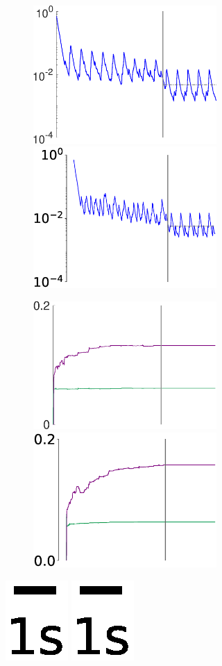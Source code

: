 \begin{figure}
\begin{subfigure}{\textwidth}
\begin{subfigure}{\textwidth}
        \end{subfigure}
        
        \textbf{}\begin{subfigure}{\textwidth}
        \centering
        
        \includegraphics[height=0.12\linewidth,width=.45\linewidth]{Figures/Fig_T1/MATLAB/ST_T1_MSE.eps}
        \includegraphics[height=0.12\linewidth,width=.45\linewidth]{Figures/Fig_T1/Python/ST_T1_MSE.eps}
        
        \end{subfigure}
        
        
        \textbf{}\begin{subfigure}{\textwidth}
        \centering
        
        \includegraphics[trim=0cm 0cm 1cm 0cm, clip=true,height=0.12\linewidth,width=.45\linewidth]{Figures/Fig_T1/MATLAB/ST_T1_W_norm.eps}
        \hspace{.3em}
        \includegraphics[trim=0cm 0cm 1cm 0cm, clip=true,height=0.12\linewidth,width=.45\linewidth]{Figures/Fig_T1/Python/ST_T1_W_norm.eps}
        
        \end{subfigure}


        
        
        \includegraphics[trim=2cm 6cm 2cm 6cm, clip=true,height=0.05\linewidth,width=.4\linewidth]{Figures/Fig_T1/Python/ST_T1_Scale.eps}
        \includegraphics[trim=2cm 4cm 2cm 6cm, clip=true,height=0.05\linewidth,width=.45\linewidth]{Figures/Fig_T1/Python/ST_T1_Scale.eps}
        


\end{subfigure}
\end{figure}
